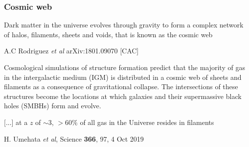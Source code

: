 \begin{frame}
  \frametitle{Cosmic web}

      Dark matter in the universe evolves through gravity to form a complex network
      of halos, filaments, sheets and voids, that is known as the cosmic web

      {\tiny A.C Rodriguez \emph{et al} arXiv:1801.09070 [CAC]}

    Cosmological simulations of structure formation predict that the
    majority of gas in the intergalactic medium (IGM) is distributed
    in a cosmic web of sheets and filaments as a consequence of
    gravitational collapse.  The intersections of these structures
    become the locations at which galaxies and their supermassive
    black holes (SMBHs) form and evolve.

    [...] at a $z$ of $\sim 3$, $>60\%$ of all gas in the
    Universe resides in filaments
    
    {\tiny H. Umehata \emph{et al}, Science  \textbf{366}, 97, 4 Oct 2019}



\end{frame}


